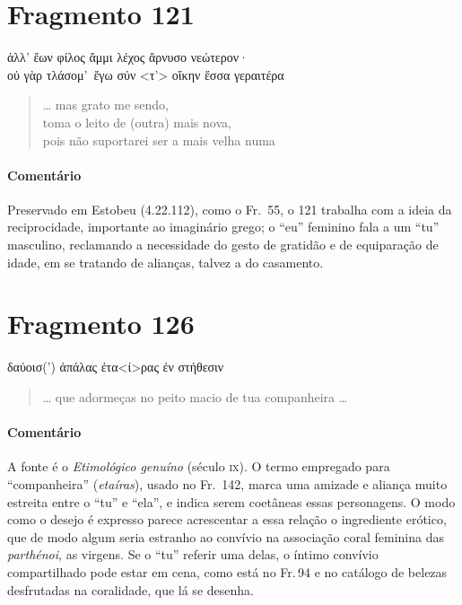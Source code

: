 {\pagebreak
\section{Fragmento 121}

\begin{gkverse}
ἀλλ’ ἔων φίλος ἄμμι λέχος ἄρνυσο νεώτερον·\\
οὐ γὰρ τλάσομ’ ἔγω σύν <τ’> οἴκην ἔσσα γεραιτέρα
\end{gkverse}

\begin{verse}
\ldots{} mas grato me sendo,\\
toma o leito de (outra) mais nova, \\
pois não suportarei ser a mais velha numa 
\end{verse}

{\paragraph{Comentário} Preservado em Estobeu (4.22.112), como o Fr.~55, o 121 trabalha com a ideia da
reciprocidade, importante ao imaginário grego; o “eu” feminino fala a um “tu”
masculino, reclamando a necessidade do gesto de gratidão e de equiparação de
idade, em se tratando de alianças, talvez a do casamento.}

\section{Fragmento 126}

\begin{gkverse}
δαύοισ(’) ἀπάλας ἐτα<ί>ρας ἐν στήθεσιν
\end{gkverse}

\begin{verse}
\ldots{} que adormeças no peito macio de tua companheira \ldots{} 
\end{verse}

{\paragraph{Comentário} A fonte é o \textit{Etimológico genuíno }(século \textsc{ix}). O termo empregado para
“companheira” (\textit{etaíras}), usado no Fr.~142, marca uma amizade e aliança muito estreita entre o “tu”
e “ela”, e indica serem coetâneas essas personagens. O modo como o desejo é expresso parece acrescentar a essa relação o
ingrediente erótico, que de modo algum seria estranho ao convívio na associação coral feminina das \textit{parthénoi}, as virgens. Se o ``tu'' referir uma delas, o íntimo convívio compartilhado pode estar em cena, como está no Fr.\,94 e no catálogo de belezas desfrutadas na coralidade, que lá se desenha.}




}
